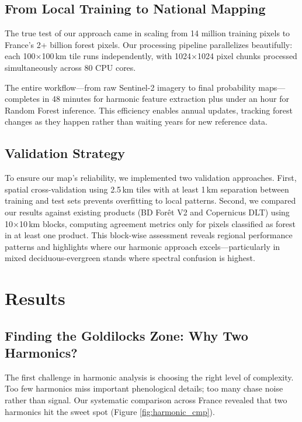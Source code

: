 \documentclass[utf8]{FrontiersinHarvard}
\begin{document}
\subsection{From Local Training to National Mapping}

The true test of our approach came in scaling from 14 million training pixels to France's 2+ billion forest pixels. Our processing pipeline parallelizes beautifully: each 100×100\,km tile runs independently, with 1024×1024 pixel chunks processed simultaneously across 80 CPU cores.

The entire workflow—from raw Sentinel-2 imagery to final probability maps—completes in 48 minutes for harmonic feature extraction plus under an hour for Random Forest inference. This efficiency enables annual updates, tracking forest changes as they happen rather than waiting years for new reference data.

\subsection{Validation Strategy}

To ensure our map's reliability, we implemented two validation approaches. First, spatial cross-validation using 2.5\,km tiles with at least 1\,km separation between training and test sets prevents overfitting to local patterns. Second, we compared our results against existing products (BD Forêt V2 and Copernicus DLT) using 10×10\,km blocks, computing agreement metrics only for pixels classified as forest in at least one product. This block-wise assessment reveals regional performance patterns and highlights where our harmonic approach excels—particularly in mixed deciduous-evergreen stands where spectral confusion is highest.

\section{Results}

\subsection{Finding the Goldilocks Zone: Why Two Harmonics?}

The first challenge in harmonic analysis is choosing the right level of complexity. Too few harmonics miss important phenological details; too many chase noise rather than signal. Our systematic comparison across France revealed that two harmonics hit the sweet spot (Figure \ref{fig:harmonic_cmp}).
\end{document}
